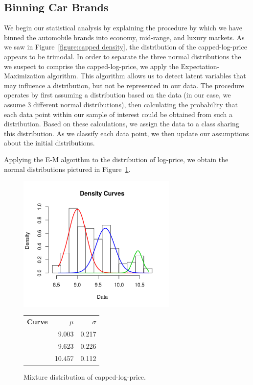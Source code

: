 \documentclass[a4paper, 10pt, titlepage]{article}
\begin{document}
\subsection{Binning Car Brands}
	We begin our statistical analysis by explaining the procedure by which we have binned the automobile brands into economy, mid-range, and luxury markets. As we saw in Figure~\ref{figure:capped density}, the distribution of the capped-log-price appears to be trimodal. In order to separate the three normal distributions the we suspect to comprise the capped-log-price, we apply the Expectation-Maximization algorithm. This algorithm allows us to detect latent variables that may influence a distribution, but not be represented in our data. The procedure operates by first assuming a distribution based on the data (in our case, we assume 3 different normal distributions), then calculating the probability that each data point within our sample of interest could be obtained from such a distribution. Based on these calculations, we assign the data to a class sharing this distribution. As we classify each data point, we then update our assumptions about the initial distributions.
	
	Applying the E-M algorithm to the distribution of log-price, we obtain the normal distributions pictured in Figure~\ref{figure:mixture dist}.
	
	\begin{figure}[!ht]
	\centering
	    \includegraphics[width = 0.7\textwidth]{images/mixturedist.png}
	    \\
	    \begin{tabular}{lrr}
	         \textbf{Curve} & \textbf{$\mu$} & \textbf{$\sigma$} \\
	         \color{red}{Red} & 9.003 & 0.217\\
 	         \color{blue}{Blue} & 9.623 & 0.226\\
	         \color{green}{Green} & 10.457 & 0.112 \\
	    \end{tabular}
	\caption{Mixture distribution of capped-log-price.}
	\label{figure:mixture dist}
    \end{figure}
    
\end{document}
